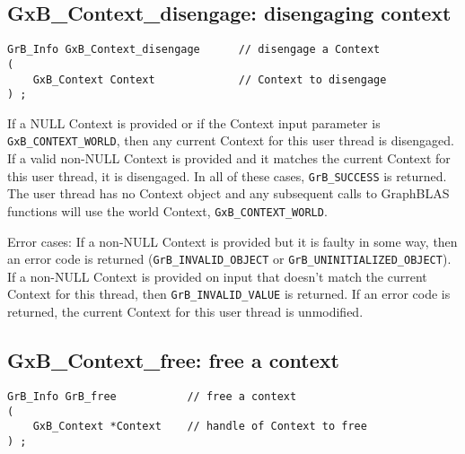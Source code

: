 \documentclass[12pt]{article}
\begin{document}
\subsection{{\sf GxB\_Context\_disengage:}  disengaging context}
\label{context_disengage}

\begin{mdframed}[userdefinedwidth=6in]
{\footnotesize
\begin{verbatim}
GrB_Info GxB_Context_disengage      // disengage a Context
(
    GxB_Context Context             // Context to disengage
) ;
\end{verbatim} } \end{mdframed}

If a NULL Context is provided or if the Context input parameter is
\verb'GxB_CONTEXT_WORLD', then any current Context for this user thread is
disengaged.  If a valid non-NULL Context is provided and it matches the
current Context for this user thread, it is disengaged.  In all of these
cases, \verb'GrB_SUCCESS' is returned.  The user thread has no Context object and
any subsequent calls to GraphBLAS functions will use the world Context,
\verb'GxB_CONTEXT_WORLD'.

Error cases: If a non-NULL Context is provided but it is faulty in some way,
then an error code is returned (\verb'GrB_INVALID_OBJECT' or
\verb'GrB_UNINITIALIZED_OBJECT').  If a non-NULL Context is provided on input
that doesn't match the current Context for this thread, then
\verb'GrB_INVALID_VALUE' is returned.  If an error code is returned, the
current Context for this user thread is unmodified.

\subsection{{\sf GxB\_Context\_free:} free a context}
\label{context_free}

\begin{mdframed}[userdefinedwidth=6in]
{\footnotesize
\begin{verbatim}
GrB_Info GrB_free           // free a context
(
    GxB_Context *Context    // handle of Context to free
) ;
\end{verbatim} } \end{mdframed}
\end{document}
